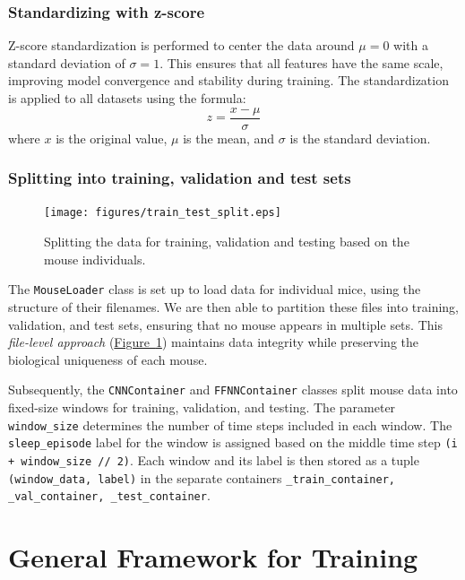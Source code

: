 \documentclass{article}
\begin{document}
\begin{multicols}{2}
\subsubsection*{Standardizing with z-score}
Z-score standardization is performed to center the data around $\mu = 0$ with a standard deviation of $\sigma = 1$. This ensures that all features have the same scale, improving model convergence and stability during training. The standardization is applied to all datasets using the formula: $$z = \frac{x - \mu}{\sigma}$$
where $x$ is the original value, $\mu$ is the mean, and $\sigma$ is the standard deviation.\\

\subsubsection*{Splitting into training, validation and test sets}

\begin{figure}[H]
    \centering
    \texttt{[image: figures/train\_test\_split.eps]} 
    \caption{Splitting the data for training, validation and testing based on the mouse individuals.}
    \label{fig:train_test_split}
\end{figure}

The \texttt{MouseLoader} class is set up to load data for individual mice, using the structure of their filenames. We are then able to partition these files into training, validation, and test sets, ensuring that no mouse appears in multiple sets. This \textit{file-level approach} (\hyperref[fig:ffnn_opt]{Figure~\ref*{fig:train_test_split}}) maintains data integrity while preserving the biological uniqueness of each mouse.

Subsequently, the \texttt{CNNContainer} and \texttt{FFNNContainer} classes  split mouse data into fixed-size windows for training, validation, and testing. The parameter \texttt{window\_size} determines the number of time steps included in each window. %
The \texttt{sleep\_episode} label for the window is assigned based on the middle time step \texttt{(i + window\_size // 2)}. Each window and its label is then stored as a tuple \texttt{(window\_data, label)} in the separate containers \texttt{\_train\_container, \_val\_container, \_test\_container}.

\end{multicols}
\section*{General Framework for Training}
\end{document}
